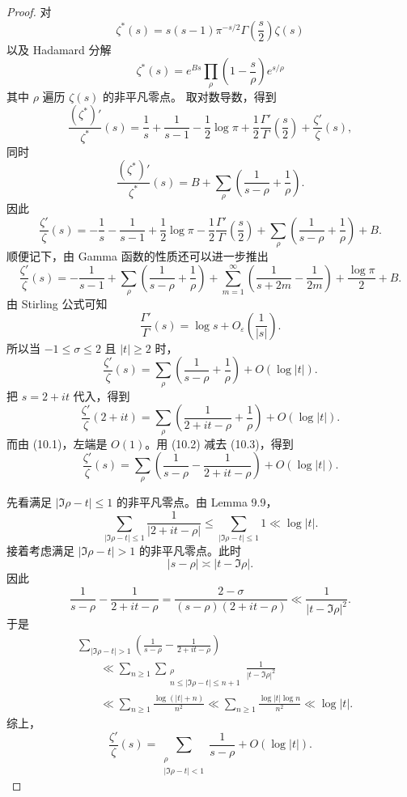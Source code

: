 	\begin{proof}
		对
	\[
		\zeta^*(s)
		=
		s(s-1)\pi^{-s/2}\Gamma\left(\frac{s}{2}\right)\zeta(s)
	\]
	以及 Hadamard 分解
	\[
			\zeta^*(s)
			=
			e^{Bs}\prod_\rho
			\left(1-\frac{s}{\rho}\right)e^{s/\rho}
		\]
		其中 $\rho$ 遍历 $\zeta(s)$ 的非平凡零点。
			取对数导数，得到
	\[
		\frac{(\zeta^*)'}{\zeta^*}(s)
		=
		\frac1s+\frac1{s-1}
		-\frac12\log\pi
		+\frac12\frac{\Gamma'}{\Gamma}\left(\frac{s}{2}\right)
		+
		\frac{\zeta'}{\zeta}(s),
	\]
	同时
	\[
		\frac{(\zeta^*)'}{\zeta^*}(s)
		=
		B+
		\sum_\rho
		\left(\frac1{s-\rho}+\frac1{\rho}\right).
	\]
	因此
	\[
		\frac{\zeta'}{\zeta}(s)
		=
		-\frac1s-\frac1{s-1}
		+\frac12\log\pi
		-\frac12\frac{\Gamma'}{\Gamma}\left(\frac{s}{2}\right)
		+
		\sum_\rho
		\left(\frac1{s-\rho}+\frac1{\rho}\right)
		+
		B.
	\]
	顺便记下，由 Gamma 函数的性质还可以进一步推出
	\[
		\frac{\zeta'}{\zeta}(s)
		=
		-\frac1{s-1}
		+
		\sum_\rho
		\left(\frac1{s-\rho}+\frac1{\rho}\right)
		+
		\sum_{m=1}^{\infty}
		\left(\frac1{s+2m}-\frac1{2m}\right)
		+
		\frac{\log\pi}{2}
		+
		B.
	\]
	由 Stirling 公式可知
	\[
		\frac{\Gamma'}{\Gamma}(s)
		=
		\log s+O_\varepsilon\left(\frac1{|s|}\right).
	\]
	所以当 $-1\leq\sigma\leq 2$ 且 $|t|\geq2$ 时，
	\begin{equation}
		\frac{\zeta'}{\zeta}(s)
		=
		\sum_\rho
		\left(\frac1{s-\rho}+\frac1{\rho}\right)
		+
		O(\log |t|).
		\tag{10.2}
	\end{equation}
	把 $s=2+it$ 代入，得到
	\begin{equation}
		\frac{\zeta'}{\zeta}(2+it)
		=
		\sum_\rho
		\left(\frac1{2+it-\rho}+\frac1{\rho}\right)
		+
		O(\log |t|).
		\tag{10.3}
	\end{equation}
	而由 (10.1)，左端是 $O(1)$。用 (10.2) 减去 (10.3)，得到
	\[
		\frac{\zeta'}{\zeta}(s)
		=
		\sum_\rho
		\left(
			\frac1{s-\rho}
			-
			\frac1{2+it-\rho}
		\right)
		+
		O(\log |t|).
	\]

		先看满足 $|\Im\rho-t|\leq1$ 的非平凡零点。由 Lemma 9.9，
	\[
		\sum_{|\Im\rho-t|\leq1}\frac1{|2+it-\rho|}
		\leq
		\sum_{|\Im\rho-t|\leq1}1
		\ll
		\log |t|.
	\]
		接着考虑满足 $|\Im\rho-t|>1$ 的非平凡零点。此时
	\[
		|s-\rho|\asymp |t-\Im\rho|.
	\]
	因此
	\[
		\frac1{s-\rho}
		-
		\frac1{2+it-\rho}
		=
		\frac{2-\sigma}{(s-\rho)(2+it-\rho)}
		\ll
		\frac1{|t-\Im\rho|^2}.
	\]
	于是
	\[
	\begin{aligned}
		&
		\sum_{|\Im\rho-t|>1}
		\left(
			\frac1{s-\rho}
			-
			\frac1{2+it-\rho}
		\right) \\
		&\qquad\ll
		\sum_{n\geq1}
		\sum_{\substack{\rho\\ n\leq |\Im\rho-t|\leq n+1}}
		\frac1{|t-\Im\rho|^2} \\
		&\qquad\ll
		\sum_{n\geq1}\frac{\log(|t|+n)}{n^2}
		\ll
		\sum_{n\geq1}\frac{\log |t|\log n}{n^2}
		\ll
		\log |t|.
	\end{aligned}
	\]
	综上，
	\[
		\frac{\zeta'}{\zeta}(s)
		=
		\sum_{\substack{\rho\\ |\Im\rho-t|<1}}
		\frac1{s-\rho}
		+
		O(\log |t|).
	\]
\end{proof}

